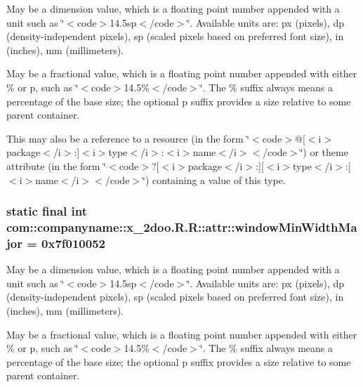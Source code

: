 May be a dimension value, which is a floating point number appended with a unit such as \char`\"{}$<$code$>$14.5sp$<$/code$>$\char`\"{}. Available units are: px (pixels), dp (density-independent pixels), sp (scaled pixels based on preferred font size), in (inches), mm (millimeters). 

May be a fractional value, which is a floating point number appended with either \% or p, such as \char`\"{}$<$code$>$14.5\%$<$/code$>$\char`\"{}. The \% suffix always means a percentage of the base size; the optional p suffix provides a size relative to some parent container. 

This may also be a reference to a resource (in the form \char`\"{}$<$code$>$@\mbox{[}$<$i$>$package$<$/i$>$:\mbox{]}$<$i$>$type$<$/i$>$:$<$i$>$name$<$/i$>$$<$/code$>$\char`\"{}) or theme attribute (in the form \char`\"{}$<$code$>$?\mbox{[}$<$i$>$package$<$/i$>$:\mbox{]}\mbox{[}$<$i$>$type$<$/i$>$:\mbox{]}$<$i$>$name$<$/i$>$$<$/code$>$\char`\"{}) containing a value of this type. \hypertarget{classcom_1_1companyname_1_1x__2doo_1_1_r_1_1attr_7a57784c7bb33cd04c80f9c559ae7df0}{
\subsubsection[{windowMinWidthMajor}]{\setlength{\rightskip}{0pt plus 5cm}static final int com::companyname::x\_\-2doo.R.R::attr::windowMinWidthMajor = 0x7f010052}}
\label{classcom_1_1companyname_1_1x__2doo_1_1_r_1_1attr_7a57784c7bb33cd04c80f9c559ae7df0}


May be a dimension value, which is a floating point number appended with a unit such as \char`\"{}$<$code$>$14.5sp$<$/code$>$\char`\"{}. Available units are: px (pixels), dp (density-independent pixels), sp (scaled pixels based on preferred font size), in (inches), mm (millimeters). 

May be a fractional value, which is a floating point number appended with either \% or p, such as \char`\"{}$<$code$>$14.5\%$<$/code$>$\char`\"{}. The \% suffix always means a percentage of the base size; the optional p suffix provides a size relative to some parent container. 

